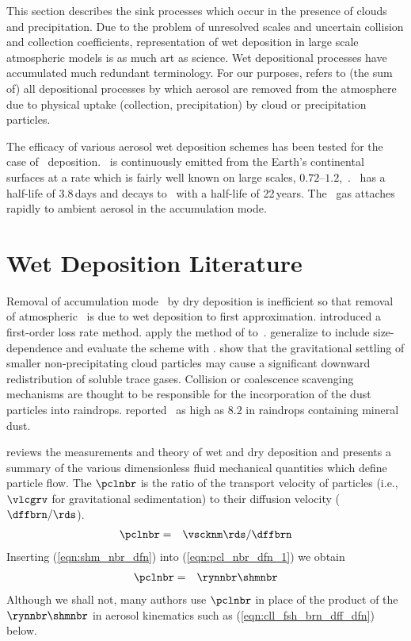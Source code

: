 \documentclass[12pt,twoside]{book}
\begin{document}
This section describes the sink processes which occur in the presence
of clouds and precipitation.
Due to the problem of unresolved scales and uncertain collision and
collection coefficients, representation of wet deposition in large
scale atmospheric models is as much art as science.
Wet depositional processes have accumulated much redundant
terminology.
For our purposes,  refers to (the sum of) all
depositional processes by which aerosol are removed from the
atmosphere due to physical uptake (collection, precipitation) by
cloud or precipitation particles.

The efficacy of various aerosol wet deposition schemes has been tested
for the case of \PbCCX\ deposition.
\RnCCXXII\ is continuously emitted from the Earth's continental surfaces
at a rate which is fairly well known on large scales,
$0.72$--$1.2$,\axcmSs\ \cite[]{GBS98}.  
\RnCCXXII\ has a half-life of 3.8\,days and decays to \PbCCX\ with a
half-life of 22\,years.
The \PbCCX\ gas attaches rapidly to ambient aerosol in the
accumulation mode.

\section{Wet Deposition Literature}\label{sxn:wdp_ltr}

Removal of accumulation mode \PbCCX\ by dry deposition is inefficient
so that removal of atmospheric \PbCCX\ is due to wet deposition to
first approximation.  
\cite{GiC86} introduced a first-order loss rate method.
\cite{BJG93} apply the method of \cite{GiC86} to~\PbCCX.
\cite{GBS98} generalize \cite{BJG93} to include size-dependence and
evaluate the scheme with \PbCCX.
\cite{LaC982} show that the gravitational settling of smaller
non-precipitating cloud particles may cause a significant downward
redistribution of soluble trace gases.
Collision or coalescence scavenging mechanisms are thought to be
responsible for the incorporation of the dust particles into raindrops.
\cite{LPG90} reported \pH\ as high as $8.2$ in raindrops containing
mineral dust.

\cite{Sli82,Sli84} reviews the measurements and theory of wet and dry
deposition and presents a summary of the various dimensionless fluid
mechanical quantities which define particle flow.
The  $\pclnbr$ is the ratio of the transport
velocity of particles (i.e., $\vlcgrv$ for gravitational
sedimentation) to their diffusion velocity ($\dffbrn/\rds$).
\begin{eqnarray}
\pclnbr & = & \vscknm \rds / \dffbrn
\label{eqn:pcl_nbr_dfn_1}
\end{eqnarray}
Inserting (\ref{eqn:shm_nbr_dfn}) into (\ref{eqn:pcl_nbr_dfn_1}) we
obtain 
\begin{eqnarray}
\pclnbr & = & \rynnbr \shmnbr
\label{eqn:pcl_nbr_dfn_2}
\end{eqnarray}
Although we shall not, many authors use $\pclnbr$ in place of the
product of the $\rynnbr \shmnbr$ in aerosol kinematics such as
(\ref{eqn:cll_fsh_brn_dff_dfn}) below. 
\end{document}
